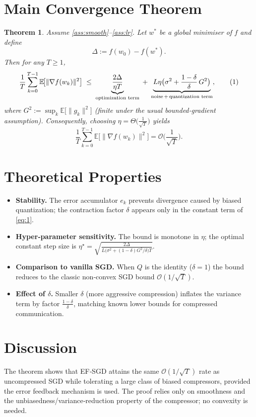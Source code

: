\documentclass{article}
\newtheorem{theorem}{Theorem}
\newcommand{\E}{\mathbb{E}}
\begin{document}
\section*{Main Convergence Theorem}
\begin{theorem}\label{thm:main}
Assume \ref{ass:smooth}–\ref{ass:lr}. Let $w^{*}$ be a global minimiser of $f$ and define
\[
\Delta:=f(w_{0})-f(w^{*}).
\]
Then for any $T\ge1$,
\[
\frac{1}{T}\sum_{k=0}^{T-1}\E\!\big[\|\nabla f(w_{k})\|^{2}\big]
\;\le\;
\underbrace{\frac{2\Delta}{\eta T}}_{\text{optimization term}}
\;+\;
\underbrace{L\eta\big(\sigma^{2}+\frac{1-\delta}{\delta}\,G^{2}\big)}_{\text{noise\,+\,quantization term}},
\tag{1}
\]
where $G^{2}:=\sup_{k}\E\!\big[\|g_{k}\|^{2}\big]$ (finite under the usual bounded‑gradient assumption).
Consequently, choosing $\eta=\Theta\!\big(\frac{1}{\sqrt{T}}\big)$ yields
\[
\frac{1}{T}\sum_{k=0}^{T-1}\E\!\big[\|\nabla f(w_{k})\|^{2}\big]=\mathcal O\!\Big(\frac{1}{\sqrt{T}}\Big).
\]
\end{theorem}

\section*{Theoretical Properties}
\begin{itemize}
\item \textbf{Stability.} The error accumulator $e_{k}$ prevents divergence caused by biased quantization; the contraction factor $\delta$ appears only in the constant term of \eqref{eq:1}.
\item \textbf{Hyper‑parameter sensitivity.} The bound is monotone in $\eta$; the optimal constant step size is $\eta^{\star}= \sqrt{\frac{2\Delta}{L\big(\sigma^{2}+(1-\delta)G^{2}/\delta\big)T}}$.
\item \textbf{Comparison to vanilla SGD.} When $Q$ is the identity ($\delta=1$) the bound reduces to the classic non‑convex SGD bound $\mathcal O(1/\sqrt{T})$.
\item \textbf{Effect of $\delta$.} Smaller $\delta$ (more aggressive compression) inflates the variance term by factor $\frac{1-\delta}{\delta}$, matching known lower bounds for compressed communication.
\end{itemize}

\section*{Discussion}
The theorem shows that EF‑SGD attains the same $\mathcal O(1/\sqrt{T})$ rate as uncompressed SGD while tolerating a large class of biased compressors, provided the error feedback mechanism is used. The proof relies only on smoothness and the unbiasedness/variance‑reduction property of the compressor; no convexity is needed.
\end{document}
